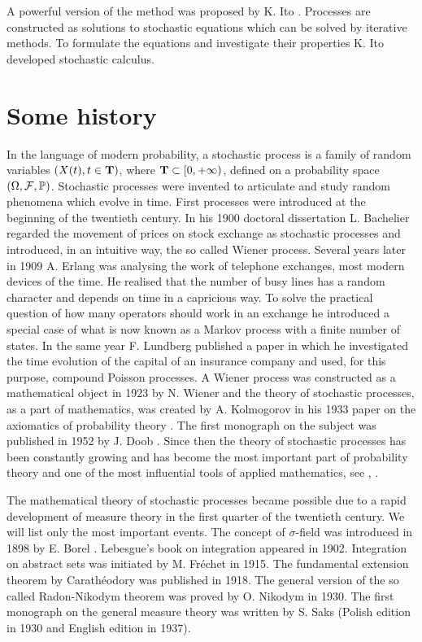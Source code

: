 \documentclass[preprint]{imsart}
\def\P{\mathbb P}
\begin{document}
{\noindent A powerful version of the method was proposed by K. Ito \cite{ito}.
Processes are constructed as solutions to stochastic
equations which can be solved by iterative methods. To formulate the equations and investigate their properties
K. Ito developed stochastic calculus.


\section{Some history}

\noindent In the language of modern probability, a stochastic process is a
family of random variables $(X(t), t\in {\bf T})$, where ${\bf
T}\subset [0, +\infty)$, defined on a probability space $(\Omega,
{\cal F}, \P)$. Stochastic processes were invented to
articulate and  study random phenomena which evolve in time.
First processes were introduced at the beginning of the twentieth
century. In his 1900 doctoral dissertation L. Bachelier \cite{bib1} regarded
the movement of prices on stock exchange as stochastic processes
and introduced, in an intuitive way, the so called Wiener
process. Several years later in 1909 A. Erlang \cite{bib2} was analysing the
work of telephone exchanges, most modern devices of the time. He
realised that the number of busy lines has a random character and
depends on time in a capricious way. To solve the practical question
of how many operators should work in an exchange he introduced a
special case of  what is now known  as a Markov process with a
finite number of states. In the same year F. Lundberg \cite{bib3} published  a
paper in which he investigated the time evolution of the  capital of
an insurance company and used, for this purpose, compound Poisson
processes. A Wiener process was constructed as a mathematical object in 1923
by N. Wiener \cite{bib7}  and the theory of stochastic processes, as a
part of mathematics, was created by A. Kolmogorov in his 1933 paper on
the axiomatics of probability theory \cite{bib5}. The first monograph on the
subject was published in 1952 by J. Doob \cite{bib6} . Since then the theory of
stochastic processes has been constantly growing and has become the most
important part of  probability theory and one of the most
influential tools of  applied mathematics, see  \cite{bib26}, \cite{bibVII}.
\vspace{3mm}

\noindent The mathematical
theory of stochastic processes became possible due to a rapid
development of  measure theory in the first quarter of the
twentieth century. We will list only the most important events. The
concept of $\sigma$-field was introduced in 1898 by E. Borel \cite{bibI}. Lebesgue's book on integration
\cite{bibII}
 appeared in 1902. Integration on abstract sets
was initiated by M. Fr\'echet \cite{bibIII} in 1915. The fundamental extension theorem by Carath\'eodory \cite{bibIV}
was published in 1918. The general version of the so called Radon-Nikodym theorem was proved by O. Nikodym \cite{bibV} in
 1930. The  first monograph on the general measure theory was written by S. Saks \cite{bibVI} (Polish edition in 1930
 and  English edition in 1937).
\vspace{3mm}





}
\end{document}
